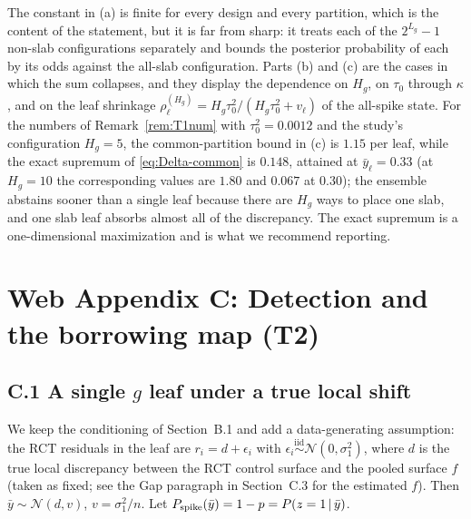 \documentclass[11pt]{article}
\newcommand{\Normal}{\mathcal{N}}
\newcommand{\given}{\,\vert\,}
\newcommand{\iid}{\stackrel{\text{iid}}{\sim}}
\theoremstyle{definition}
\theoremstyle{plain}
\begin{document}
{\begin{remA}\label{rem:constants}
The constant in (a) is finite for every design and every partition, which is the content of the statement, but it is far from sharp: it treats each of the $2^{L_g}-1$ non-slab configurations separately and bounds the posterior probability of each by its odds against the all-slab configuration. Parts (b) and (c) are the cases in which the sum collapses, and they display the dependence on $H_g$, on $\tau_0$ through $\kappa$, and on the leaf shrinkage $\rho^{(H_g)}_\ell=H_g\tau_0^2/(H_g\tau_0^2+v_\ell)$ of the all-spike state. For the numbers of Remark~\ref{rem:T1num} with $\tau_0^2=0.0012$ and the study's configuration $H_g=5$, the common-partition bound in (c) is $1.15$ per leaf, while the exact supremum of \eqref{eq:Delta-common} is $0.148$, attained at $\bar y_\ell=0.33$ (at $H_g=10$ the corresponding values are $1.80$ and $0.067$ at $0.30$); the ensemble abstains sooner than a single leaf because there are $H_g$ ways to place one slab, and one slab leaf absorbs almost all of the discrepancy. The exact supremum is a one-dimensional maximization and is what we recommend reporting.
\end{remA}

\section*{Web Appendix C: Detection and the borrowing map (T2)}

\subsection*{C.1 A single $g$ leaf under a true local shift}

We keep the conditioning of Section~B.1 and add a data-generating assumption: the RCT residuals in the leaf are $r_i=d+\epsilon_i$ with $\epsilon_i\iid\Normal(0,\sigma_1^2)$, where $d$ is the true local discrepancy between the RCT control surface and the pooled surface $f$ (taken as fixed; see the Gap paragraph in Section~C.3 for the estimated $f$). Then $\bar y\sim\Normal(d,v)$, $v=\sigma_1^2/n$. Let $\Pspike(\bar y)=1-p=P(z=1\given\bar y)$.

}
\end{document}
